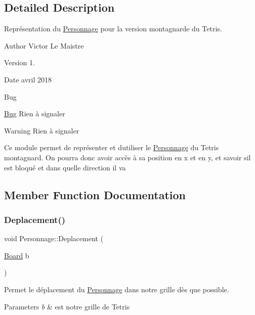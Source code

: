 \subsection{Detailed Description}
Représentation du \hyperlink{classPersonnage}{Personnage} pour la version montagnarde du Tetris. 

\begin{DoxyAuthor}{Author}
Victor Le Maistre 
\end{DoxyAuthor}
\begin{DoxyVersion}{Version}
1. 
\end{DoxyVersion}
\begin{DoxyDate}{Date}
avril 2018 
\end{DoxyDate}
\begin{DoxyRefDesc}{Bug}
\item[\hyperlink{bug__bug000009}{Bug}]Rien à signaler \end{DoxyRefDesc}
\begin{DoxyWarning}{Warning}
Rien à signaler
\end{DoxyWarning}
Ce module permet de représenter et d\textquotesingle{}utiliser le \hyperlink{classPersonnage}{Personnage} du Tetris montagnard. On pourra donc avoir accès à sa position en x et en y, et savoir s\textquotesingle{}il est bloqué et dans quelle direction il va 

\subsection{Member Function Documentation}
\mbox{\label{classPersonnage_a3248e00e7413b2a97a7f198475318d6b}} 
\subsubsection{\texorpdfstring{Deplacement()}{Deplacement()}}
{\footnotesize\ttfamily void Personnage\+::\+Deplacement (\begin{DoxyParamCaption}\item[{\hyperlink{classBoard}{Board}}]{b }\end{DoxyParamCaption})}



Permet le déplacement du \hyperlink{classPersonnage}{Personnage} dans notre grille dès que possible. 


\begin{DoxyParams}{Parameters}
{\em b} & est notre grille de Tetris \\
\hline
\end{DoxyParams}
\mbox{\label{classPersonnage_a4d5855ca459563583026c13072b72577}} 
